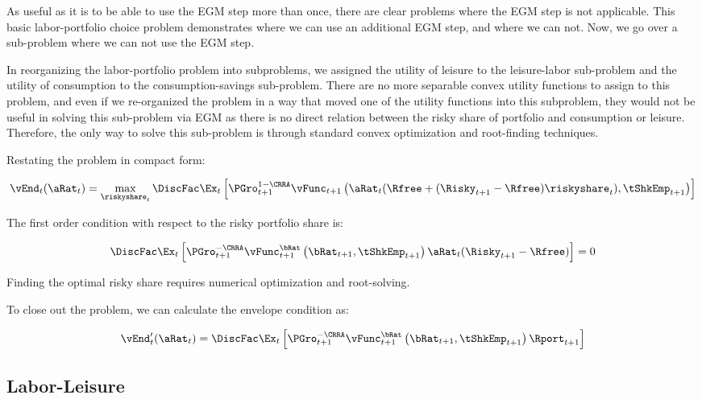 \documentclass[\econtexRoot/SequentialEGM]{subfiles}
\begin{document}
As useful as it is to be able to use the EGM step more than once, there are clear problems where the EGM step is not applicable. This basic labor-portfolio choice problem demonstrates where we can use an additional EGM step, and where we can not. Now, we go over a sub-problem where we can not use the EGM step.

In reorganizing the labor-portfolio problem into subproblems, we assigned the utility of leisure to the leisure-labor sub-problem and the utility of consumption to the consumption-savings sub-problem. There are no more separable convex utility functions to assign to this problem, and even if we re-organized the problem in a way that moved one of the utility functions into this subproblem, they would not be useful in solving this sub-problem via EGM as there is no direct relation between the risky share of portfolio and consumption or leisure. Therefore, the only way to solve this sub-problem is through standard convex optimization and root-finding techniques.

Restating the problem in compact form:

\begin{equation}
        \vEnd_{t}(\aRat_{t}) = \max_{\riskyshare_{t}} \DiscFac \Ex_{t} \left[ \PGro_{t+1}^{1-\CRRA}
        \vFunc_{t+1}\left(\aRat_{t}(\Rfree + (\Risky_{t+1} - \Rfree) \riskyshare_{t}), \tShkEmp_{t+1}\right)
        \right]
\end{equation}

The first order condition with respect to the risky portfolio share is:

\begin{equation}
        \DiscFac \Ex_{t} \left[ \PGro_{t+1}^{-\CRRA} \vFunc_{t+1}^{\bRat}\left(\bRat_{t+1}, \tShkEmp_{t+1}\right) \aRat_{t}(\Risky_{t+1} - \Rfree)  \right] = 0
\end{equation}

Finding the optimal risky share requires numerical optimization and root-solving.

To close out the problem, we can calculate the envelope condition as:

\begin{equation}
        \vEnd_{t}'(\aRat_{t}) = \DiscFac \Ex_{t} \left[ \PGro_{t+1}^{-\CRRA} \vFunc_{t+1}^{\bRat}\left(\bRat_{t+1}, \tShkEmp_{t+1}\right) \Rport_{t+1}  \right]
\end{equation}

\subsection{Labor-Leisure}
\end{document}
